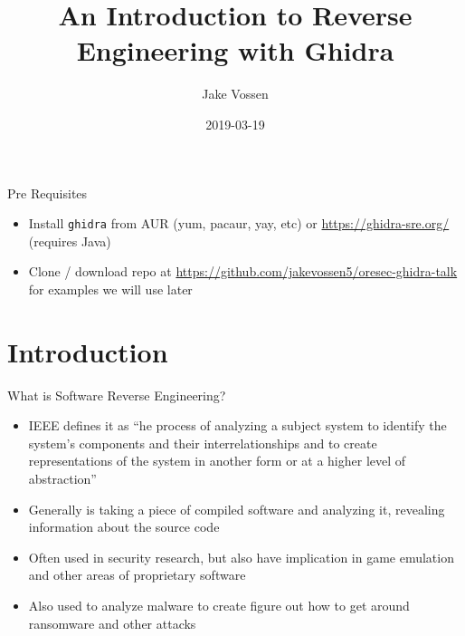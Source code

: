 \documentclass{beamer}
\title[Ghidra]{An Introduction to Reverse Engineering with Ghidra}
\author{Jake Vossen}
\institute{Colorado School of Mines - oresec}
\date{2019-03-19}
\begin{document}
\begin{frame}{Pre Requisites}
  \begin{itemize}
    \item Install \texttt{ghidra} from AUR (yum, pacaur, yay, etc) or
      \url{https://ghidra-sre.org/} (requires Java)
    \item Clone / download repo at
\url{https://github.com/jakevossen5/oresec-ghidra-talk} for examples we will use later
    \end{itemize}
\end{frame}
\begin{frame}
  \titlepage
\end{frame}


\section{Introduction}

\begin{frame}{What is Software Reverse Engineering?}

\begin{itemize}
  \item IEEE defines it as ``he process of analyzing a subject system to identify the system's components and their interrelationships and to create representations of the system in another form or at a higher level of abstraction''
  \item Generally is taking a piece of compiled software and analyzing
    it, revealing information about the source code
  \item Often used in security research, but also have implication in
    game emulation and other areas of proprietary software
  \item Also used to analyze malware to create figure out how to get
    around ransomware and other attacks
\end{itemize}

\vskip 1cm

\end{frame}
\end{document}
